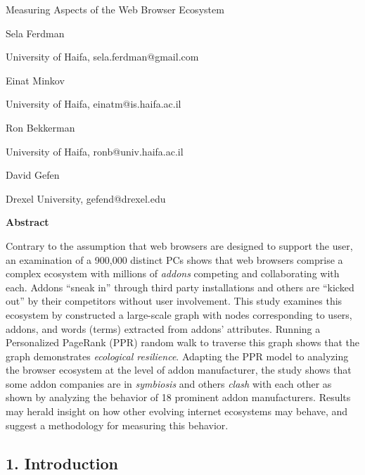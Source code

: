 \documentclass{article} %
\begin{document}


\noindent 

\noindent 

\noindent 

\noindent 

\noindent Measuring Aspects of the Web Browser Ecosystem

\noindent 

\noindent 

\noindent Sela Ferdman

\noindent University of Haifa, sela.ferdman@gmail.com

\noindent Einat Minkov

\noindent University of Haifa, einatm@is.haifa.ac.il

\noindent Ron Bekkerman

\noindent University of Haifa, ronb@univ.haifa.ac.il

\noindent David Gefen

\noindent Drexel University, gefend@drexel.edu 

 

\noindent \textbf{Abstract}

\noindent Contrary to the assumption that web browsers are designed to support the user, an examination of a 900,000 distinct PCs shows that web browsers comprise a complex ecosystem with millions of \textit{addons} competing and collaborating with each. Addons ``sneak in'' through third party installations and others are ``kicked out'' by their competitors without user involvement. This study examines this ecosystem by constructed a large-scale graph with nodes corresponding to users, addons, and words (terms) extracted from addons' attributes. Running a Personalized PageRank (PPR) random walk to traverse this graph shows that the graph demonstrates \textit{ecological resilience}. Adapting the PPR model to analyzing the browser ecosystem at the level of addon manufacturer, the study shows that some addon companies are in \textit{symbiosis} and others \textit{clash} with each other as shown by analyzing the behavior of 18 prominent addon manufacturers. Results may herald insight on how other evolving internet ecosystems may behave, and suggest a methodology for measuring this behavior. 

\noindent 

\eject  


\subsection{1.  Introduction}
\end{document}
